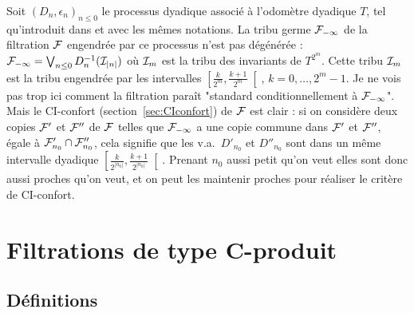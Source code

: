 \documentclass[12pt,a4paper]{article}
\begin{document}
\begin{exemple}
Soit ${(D_n, \epsilon_n)}_{n \leq 0}$ le processus dyadique 
associé à l'odomètre dyadique $T$, tel qu'introduit dans \cite{LauXLV} et avec les 
mêmes notations.
 La tribu germe $\mathcal{F}_{-\infty}$ de la filtration $\mathcal{F}$ engendrée par 
ce processus n'est pas dégénérée : 
$\mathcal{F}_{-\infty} = \bigvee_{n \leq 0} D_n^{-1}(\mathcal{I}_{|n|})$ où 
$\mathcal{I}_m$ est la tribu des invariants de $T^{2^m}$. 
Cette tribu $\mathcal{I}_m$ est la tribu engendrée par les intervalles 
$\left[\frac{k}{2^m}, \frac{k+1}{2^m}\right[$, $k=0, \ldots, 2^{m}-1$. 
Je ne vois pas trop ici comment la filtration paraît "standard conditionnellement 
à $\mathcal{F}_{-\infty}$". Mais le CI-confort (section~\ref{sec:CIconfort}) de $\mathcal{F}$ est clair : 
si on considère deux copies $\mathcal{F}'$ et $\mathcal{F}''$ de $\mathcal{F}$ 
telles que $\mathcal{F}_{-\infty}$ a une copie commune dans $\mathcal{F}'$ et $\mathcal{F}''$, égale 
à $\mathcal{F}'_{n_0} \cap \mathcal{F}''_{n_0}$, cela 
signifie que  les v.a.\ $D'_{n_0}$ et $D''_{n_0}$ sont dans un même intervalle 
dyadique $\left[\frac{k}{2^{|n_0|}}, \frac{k+1}{2^{|n_0|}}\right[$. 
Prenant $n_0$ aussi petit qu'on veut elles sont donc aussi proches qu'on veut, 
et on peut les maintenir proches pour réaliser le critère de CI-confort.  
\end{exemple}



\section{Filtrations de type C-produit}

\subsection{Définitions}
\end{document}
